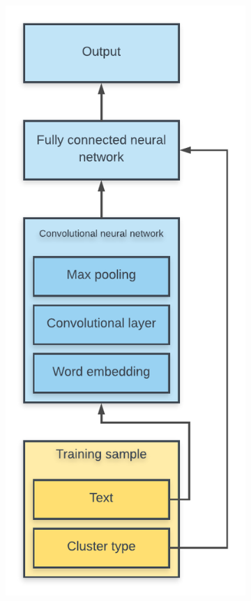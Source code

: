 \begin{figure}[htbp]
\begin{subfigure}[b]{0.45\textwidth}
    \includegraphics[width=\textwidth]{figures/nn_layout.pdf}

\end{subfigure}
\end{figure}
